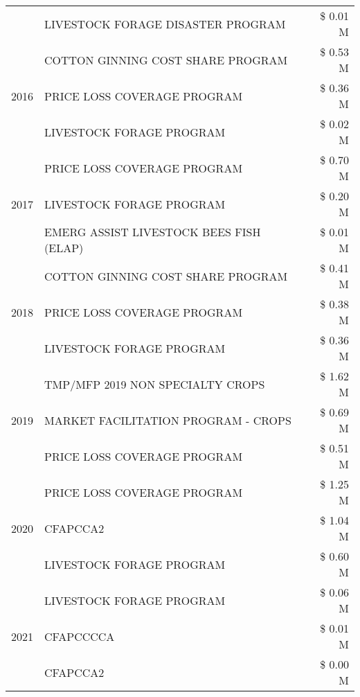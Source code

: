 \begin{tabular}{llr}
 & LIVESTOCK FORAGE DISASTER PROGRAM & \$ 0.01 M \\
\cline{1-3}
\multirow[t]{3}{*}{2016} & COTTON GINNING COST SHARE PROGRAM             & \$ 0.53 M \\
 & PRICE LOSS COVERAGE PROGRAM                   & \$ 0.36 M \\
 & LIVESTOCK FORAGE PROGRAM                      & \$ 0.02 M \\
\cline{1-3}
\multirow[t]{3}{*}{2017} & PRICE LOSS COVERAGE PROGRAM & \$ 0.70 M \\
 & LIVESTOCK FORAGE PROGRAM & \$ 0.20 M \\
 & EMERG ASSIST LIVESTOCK BEES FISH (ELAP) & \$ 0.01 M \\
\cline{1-3}
\multirow[t]{3}{*}{2018} & COTTON GINNING COST SHARE PROGRAM & \$ 0.41 M \\
 & PRICE LOSS COVERAGE PROGRAM & \$ 0.38 M \\
 & LIVESTOCK FORAGE PROGRAM & \$ 0.36 M \\
\cline{1-3}
\multirow[t]{3}{*}{2019} & TMP/MFP 2019 NON SPECIALTY CROPS & \$ 1.62 M \\
 & MARKET FACILITATION PROGRAM - CROPS & \$ 0.69 M \\
 & PRICE LOSS COVERAGE PROGRAM & \$ 0.51 M \\
\cline{1-3}
\multirow[t]{3}{*}{2020} & PRICE LOSS COVERAGE PROGRAM & \$ 1.25 M \\
 & CFAPCCA2 & \$ 1.04 M \\
 & LIVESTOCK FORAGE PROGRAM & \$ 0.60 M \\
\cline{1-3}
\multirow[t]{3}{*}{2021} & LIVESTOCK FORAGE PROGRAM & \$ 0.06 M \\
 & CFAPCCCCA & \$ 0.01 M \\
 & CFAPCCA2 & \$ 0.00 M \\
\cline{1-3}
\bottomrule
\end{tabular}
